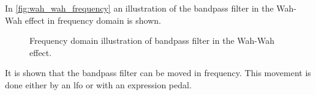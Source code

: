 In \autoref{fig:wah_wah_frequency} an illustration of the bandpass filter in the Wah-Wah effect in frequency domain is shown. 

\begin{figure}[htbp!]
\centering
\def\svgwidth{\columnwidth}

\caption{Frequency domain illustration of bandpass filter in the Wah-Wah effect.}
		\label{fig:wah_wah_frequency}
\end{figure}

It is shown that the bandpass filter can be moved in frequency. This movement is done either by an \gls{lfo} or with an expression pedal.
\newpage